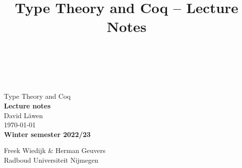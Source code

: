 \documentclass[acmsmall, nonacm, screen, dvipsnames]{acmart}
\begin{document}
\emergencystretch=12pt

\thispagestyle{empty}
\begin{titlepage}
 \begin{center}
  {\LARGE \mbox{} }\\
  {\large \mbox{} \\
  \mbox{} \\[4cm]}
  {\huge Type Theory and Coq\\[2cm]}
  {\Large\bf Lecture notes\\[1.5cm]}
 {\large David Läwen}\\[0.5cm]
\today\\[4cm]
{\small\bf Winter semester 2022/23}\\[0.5cm]
  \parbox{7cm}{%
  	\begin{center}%
  		{\large Freek Wiedijk \& Herman Geuvers}\\[1mm]
		{\footnotesize
			Radboud Universiteit Nijmegen\\
			\mbox{} }%
	\end{center}}
  \end{center}
\end{titlepage}

\title{Type Theory and Coq -- Lecture Notes}

\authorsaddresses{}

\thispagestyle{empty}
\tableofcontents
{}
\newpage


\setcounter{page}{3}












\end{document}
